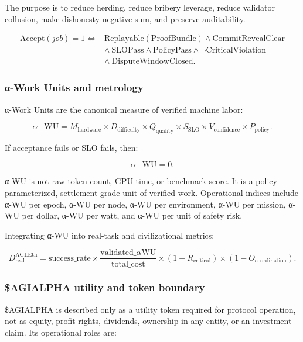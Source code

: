 \documentclass[
  11pt,
]{article}
\begin{document}
The purpose is to reduce herding, reduce bribery leverage, reduce
validator collusion, make dishonesty negative-sum, and preserve
auditability.

\[
\begin{aligned}
\mathrm{Accept}(job)=1 \iff {}&
\mathrm{Replayable}(\mathrm{ProofBundle})
\land \mathrm{CommitRevealClear} \\
&\land\ \mathrm{SLOPass}
\land \mathrm{PolicyPass}
\land \neg\mathrm{CriticalViolation} \\
&\land\ \mathrm{DisputeWindowClosed}.
\end{aligned}
\]

\subsubsection{α-Work Units and
metrology}\label{ux3b1-work-units-and-metrology}

α-Work Units are the canonical measure of verified machine labor:

\[
\alpha\mathrm{-WU}
=
M_{\mathrm{hardware}}
\times
D_{\mathrm{difficulty}}
\times
Q_{\mathrm{quality}}
\times
S_{\mathrm{SLO}}
\times
V_{\mathrm{confidence}}
\times
P_{\mathrm{policy}}.
\]

If acceptance fails or SLO fails, then:

\[
\alpha\mathrm{-WU}=0.
\]

α-WU is not raw token count, GPU time, or benchmark score. It is a
policy-parameterized, settlement-grade unit of verified work.
Operational indices include α-WU per epoch, α-WU per node, α-WU per
environment, α-WU per mission, α-WU per dollar, α-WU per watt, and α-WU
per unit of safety risk.

Integrating α-WU into real-task and civilizational metrics:

\[
D_{\mathrm{real}}^{\mathrm{AGI.Eth}}
=
\mathrm{success\_rate}
\times
\frac{\mathrm{validated\_}\alpha\mathrm{WU}}{\mathrm{total\_cost}}
\times
(1-R_{\mathrm{critical}})
\times
(1-O_{\mathrm{coordination}}).
\]

\subsubsection{\$AGIALPHA utility and token
boundary}\label{agialpha-utility-and-token-boundary}

\$AGIALPHA is described only as a utility token required for protocol
operation, not as equity, profit rights, dividends, ownership in any
entity, or an investment claim. Its operational roles are:
\end{document}
